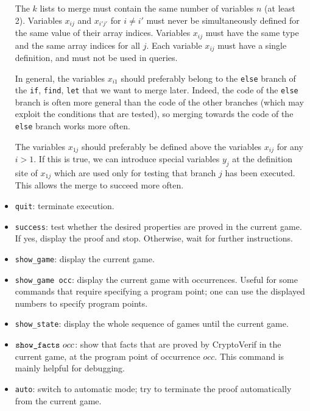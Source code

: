 \documentclass{article}
\begin{document}
\begin{itemize}
  The $k$ lists to merge must contain the same number of variables $n$
  (at least 2). Variables $x_{ij}$ and $x_{i'j'}$ for $i \neq i'$ must
  never be simultaneously defined for the same value of their array
  indices.  Variables $x_{ij}$ must have the same type and the same
  array indices for all $j$. Each variable $x_{ij}$ must have a single
  definition, and must not be used in queries.

  In general, the variables $x_{i1}$ should preferably belong to the
  \texttt{else} branch of the {\tt if}, {\tt find}, {\tt let} that we
  want to merge later. Indeed, the code of the {\tt else} branch is
  often more general than the code of the other branches (which may
  exploit the conditions that are tested), so merging towards the code
  of the {\tt else} branch works more often.

  The variables $x_{1j}$ should preferably be defined above the
  variables $x_{ij}$ for any $i > 1$. If this is true, we can
  introduce special variables $y_j$ at the definition site of $x_{1j}$
  which are used only for testing that branch $j$ has been executed.
  This allows the merge to succeed more often.

\item \texttt{quit}: terminate execution.

\item \texttt{success}: test whether the desired properties are
proved in the current game. If yes, display the proof and stop.
Otherwise, wait for further instructions.

\item \texttt{show\string_game}: display the current game.

\item \texttt{show\string_game occ}: display the current game with
  occurrences. Useful for some commands that require specifying a
  program point; one can use the displayed numbers to specify program
  points.

\item \texttt{show\string_state}: display the whole sequence
of games until the current game.

\item $\texttt{show\string_facts}\ occ$: show that facts that are proved
by CryptoVerif in the current game, at the program point of occurrence $occ$. 
This command is mainly helpful for debugging.

\item \texttt{auto}: switch to automatic mode; try to
terminate the proof automatically from the current game.


\end{itemize}
\end{document}
